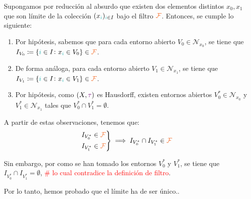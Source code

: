 \documentclass[titlepage,11pt,a4paper]{book}
\newcommand{\filt}{\ensuremath{\textcolor{Orange}{\mathcal{F}}}}
\newcommand{\ii}{\ensuremath{\textcolor{TealBlue}{i}}}
\newcommand{\taut}{\textcolor{Fuchsia}{\tau}}
\begin{document}
    \begin{resol}
        Supongamos por reducción al absurdo que existen dos elementos distintos $x_0, x_1$ que son límite de la colección $(x_{\ii})_{\ii \in I}$ bajo el filtro $\filt$. Entonces, se cumple lo siguiente:
        \begin{enumerate}
            \item[(1)] Por hipótesis, sabemos que para cada entorno abierto $V_0 \in \mathcal{N}_{x_0}$, se tiene que $I_{V_0} \coloneq \{\ii \in I \colon x_{\ii} \in V_0\} \in \filt$.
            \item[(2)] De forma análoga, para cada entorno abierto $V_1 \in \mathcal{N}_{x_1}$, se tiene que $I_{V_1} \coloneq \{\ii \in I \colon x_{\ii} \in V_1\} \in \filt$.
            \item[(3)] Por hipótesis, como $(X, \taut)$  es Hausdorff, existen entornos abiertos $V_{0}^{*} \in \mathcal{N}_{x_0}$ y $V_{1}^{*} \in \mathcal{N}_{x_1}$ tales que $V_{0}^{*} \cap V_{1}^{*} = \emptyset$.
        \end{enumerate}

        A partir de estas observaciones, tenemos que:
        \[
        \left.
        \begin{aligned}
            I_{V_{0}^{*}} \in \filt \\
            I_{V_{1}^{*}} \in \filt
        \end{aligned}
        \right\} \implies I_{V_{0}^{*}} \cap I_{V_{1}^{*}} \in \filt
        \]

        Sin embargo, por como se han tomado los entornos $V_{0}^{*}$ y $V_{1}^{*}$, se tiene que $I_{V_{0}^{*}} \cap I_{V_{1}^{*}} = \emptyset$, \textcolor{red}{\# lo cual contradice la definición de filtro}. 
        
        \medskip
        Por lo tanto, hemos probado que el límite ha de ser único..
    \end{resol}



\cleardoublepage
\printbibliography[heading=bibintoc]

\newpage
\printindex
\end{document}
